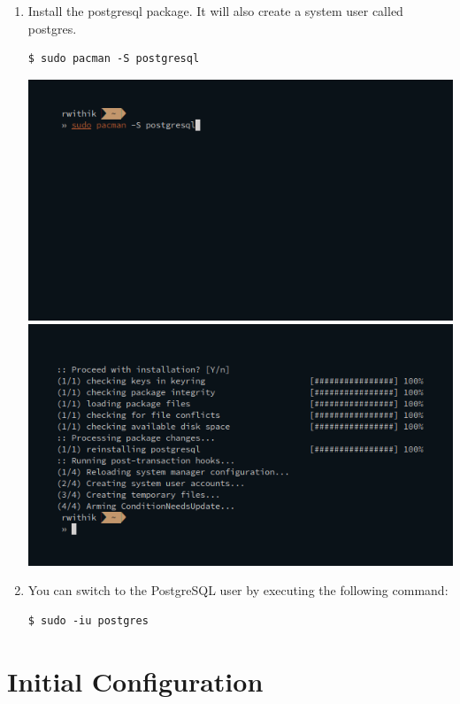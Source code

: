 \documentclass[10pt,a4paper,titlepage]{report}
\begin{document}
{\begin{enumerate}
	\item Install the postgresql package. It will also create a system user called postgres. 
		\begin{verbatim}
$ sudo pacman -S postgresql
		\end{verbatim}
		\includegraphics[width=\linewidth]{../Images/Installation/1.png}\newline
		\includegraphics[width=\linewidth]{../Images/Installation/2.png}\newline
		\item You can switch to the PostgreSQL user by executing the following command:
		\begin{verbatim}
$ sudo -iu postgres
		\end{verbatim}
\end{enumerate}

\chapter{Initial Configuration}

}
\end{document}
